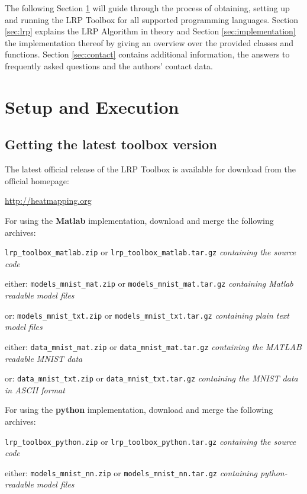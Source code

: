 \documentclass[a4wide]{article}
\begin{document}
The following Section \ref{sec:setup} will guide through the process of obtaining, setting up and running the LRP Toolbox for all supported programming languages. Section \ref{sec:lrp} explains the LRP Algorithm in theory and Section \ref{sec:implementation} the implementation thereof by giving an overview over the provided classes and functions. Section \ref{sec:contact} contains additional information, the answers to frequently asked questions and the authors' contact data.



\section{Setup and Execution}
\label{sec:setup}

\subsection*{Getting the latest toolbox version}
The latest official release of the LRP Toolbox is available for download from the official homepage:
\begin{center}
\url{http://heatmapping.org}
\end{center}

For using the \textbf{Matlab} implementation, download and merge the following archives:


\texttt{lrp\_toolbox\_matlab.zip} or \texttt{lrp\_toolbox\_matlab.tar.gz} \emph{containing the source code}


either: \texttt{models\_mnist\_mat.zip} or \texttt{models\_mnist\_mat.tar.gz} \emph{containing Matlab readable model files}


or: \texttt{models\_mnist\_txt.zip} or \texttt{models\_mnist\_txt.tar.gz} \emph{containing plain text model files}

either: \texttt{data\_mnist\_mat.zip} or \texttt{data\_mnist\_mat.tar.gz} \emph{containing the MATLAB readable MNIST data}

or: \texttt{data\_mnist\_txt.zip} or \texttt{data\_mnist\_txt.tar.gz} \emph{containing the MNIST data in ASCII format}


\vspace{0.5cm}
For using the \textbf{python} implementation, download and merge the following archives:

\texttt{lrp\_toolbox\_python.zip} or \texttt{lrp\_toolbox\_python.tar.gz} \emph{containing the source code}

either: \texttt{models\_mnist\_nn.zip} or \texttt{models\_mnist\_nn.tar.gz} \emph{containing python-readable model files}
\end{document}
